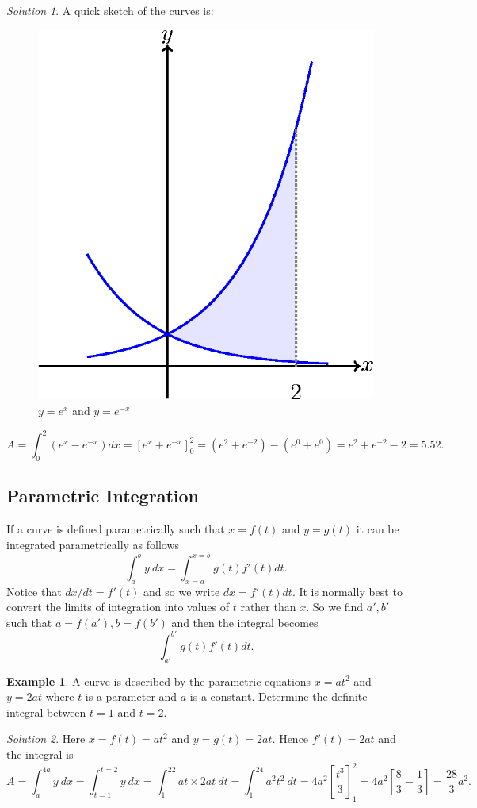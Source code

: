 \documentclass[
  11pt,
  oneside]{book}
\newcommand{\slide}{}
\theoremstyle{definition}
\theoremstyle{definition}
\newtheorem{example}{Example}[chapter]
\theoremstyle{definition}
\theoremstyle{definition}
\theoremstyle{remark}
\newtheorem*{solution}{Solution}
\begin{document}
\begin{solution}
\leavevmode

A quick sketch of the curves is:

\begin{figure}

{\centering \includegraphics[width=0.3\linewidth]{tikztopng-figure25} 

}

\caption{$y=e^x$ and $y=e^{-x}$}\label{fig:unnamed-chunk-47}
\end{figure}

\[
A = \int_0^2(e^x-e^{-x})dx = \left[e^x+e^{-x}\right]_0^2 = (e^2+e^{-2})-(e^0+e^0) = e^2+e^{-2}-2=5.52.
\]

\end{solution}

\slide

\subsection{Parametric Integration}\label{parametric-integration}

If a curve is defined parametrically such that \(x = f(t)\) and \(y = g(t)\) it can be integrated parametrically as follows
\[
\int_a^by\ dx = \int_{x=a}^{x=b}g(t)f'(t)dt.
\]
Notice that \(dx/dt = f'(t)\) and so we write \(dx = f'(t)dt\). It is normally best to convert the limits of integration into values of \(t\) rather than \(x\). So we find \(a', b'\) such that \(a=f(a'), b = f(b')\) and then the integral becomes
\[
\int_{a'}^{b'}g(t)f'(t)dt.
\]
\slide

\begin{example}
A curve is described by the parametric equations \(x = at^2\) and \(y = 2at\) where \(t\) is a parameter and \(a\) is a constant. Determine the definite integral between \(t = 1\) and \(t = 2\).
\end{example}

\begin{solution}
Here \(x=f(t)=at^2\) and \(y=g(t)=2at\). Hence \(f'(t) = 2at\) and the integral is
\[
A = \int_a^{4a} y\ dx = \int_{t=1}^{t=2}y\ dx = \int_1^22at\times 2at\ dt = \int_1^24a^2t^2\ dt = 4a^2\left[\frac{t^3}3\right]_1^2 = 4a^2\left[\frac 83-\frac13\right]=\frac{28}3a^2.
\]
\end{solution}
\end{document}
